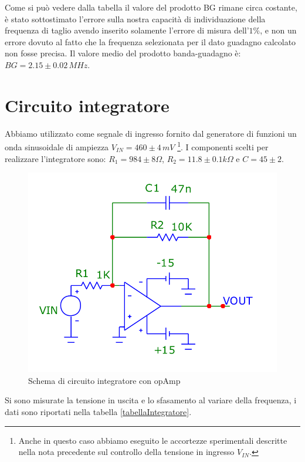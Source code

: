 \documentclass[10pt,a4paper]{article}
\begin{document}
Come si può vedere dalla tabella il valore del prodotto BG rimane circa costante, è stato sottostimato l'errore sulla nostra capacità di individuazione della frequenza di taglio avendo inserito solamente l'errore di misura dell'$1\%$, e non un errore dovuto al fatto che la frequenza selezionata per il dato guadagno calcolato non fosse precisa.
Il valore medio del prodotto banda-guadagno è: $BG = 2.15\pm0.02 \, MHz$.

\section{Circuito integratore}
Abbiamo utilizzato come segnale di ingresso fornito dal generatore di funzioni  un onda sinusoidale di ampiezza $V_{IN}=460 \pm 4 \, mV$ \footnote{Anche in questo caso abbiamo eseguito le accortezze sperimentali descritte nella nota precedente sul controllo della tensione in ingresso $V_{IN}$.}. I componenti scelti per realizzare l'integratore sono: $R_1 = 984 \pm 8 \Omega$, $R_2 = 11.8 \pm 0.1 k\Omega$ e $C = 45 \pm 2$.\\

\begin{figure}[!htb]
  \centering
  \includegraphics[scale=0.25]{integratore.png}
\caption{Schema di circuito integratore con opAmp}
\end{figure}


Si sono misurate la tensione in uscita e lo sfasamento al variare della frequenza, i dati sono riportati nella tabella \ref{tabellaIntegratore}.\\
\end{document}
